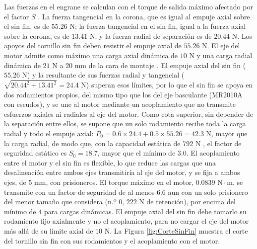 \documentclass[../../General.tex]{subfiles}
\begin{document}
Las fuerzas en el engrane se calculan con el torque de salida máximo afectado por el factor $S$ \citep{Shigley11th}. La fuerza tangencial en la corona, que es igual al empuje axial sobre el sin fin, es de $55.26\text{ N}$; la fuerza tangencial en el sin fin, igual a la fuerza axial sobre la corona, es de $13.41\text{ N}$; y la fuerza radial de separación es de $20.44\text{ N}$. Los apoyos del tornillo sin fin deben resistir el empuje axial de $55.26\text{ N}$.
El eje del motor admite como máximo una carga axial dinámica de $10\text{ N}$ y una carga radial dinámica de $21\text{ N}$ a $20\text{ mm}$ de la cara de montaje \citep{stepperonline_17hs16}. El empuje axial del sin fin ($55.26\text{ N}$) y la resultante de sus fuerzas radial y tangencial ($\sqrt{20.44^2 + 13.41^2} = 24.4\text{ N}$) superan esos límites, por lo que el sin fin se apoya en dos rodamientos propios, del mismo tipo que los del eje basculante (MR2010A con escudos), y se une al motor mediante un acoplamiento que no transmite esfuerzos axiales ni radiales al eje del motor. Como cota superior, sin depender de la separación entre ellos, se supone que un solo rodamiento recibe toda la carga radial y todo el empuje axial: $P_0 = 0.6 \times 24.4 + 0.5 \times 55.26 = 42.3\text{ N}$, mayor que la carga radial, de modo que, con la capacidad estática de $792\text{ N}$ \citep{mr2010a_bearing}, el factor de seguridad estático es $S_0 = 18.7$, mayor que el mínimo de $3.0$.
El acoplamiento entre el motor y el sin fin es flexible, lo que reduce las cargas que una desalineación entre ambos ejes transmitiría al eje del motor, y se fija a ambos ejes, de $5\text{ mm}$, con prisioneros. El torque máximo en el motor, $0.0839\text{ N}\cdot\text{m}$, se transmite con un factor de seguridad de al menos $6.6$ aun con un solo prisionero del menor tamaño que considera \citet{Shigley11th} (n.º 0, $222\text{ N}$ de retención), por encima del mínimo de $4$ para cargas dinámicas. El empuje axial del sin fin debe tomarlo su rodamiento fijo axialmente y no el acoplamiento, para no cargar el eje del motor más allá de su límite axial de $10\text{ N}$.
La Figura \ref{fig:CorteSinFin} muestra el corte del tornillo sin fin con sus rodamientos y el acoplamiento con el motor.
\end{document}
